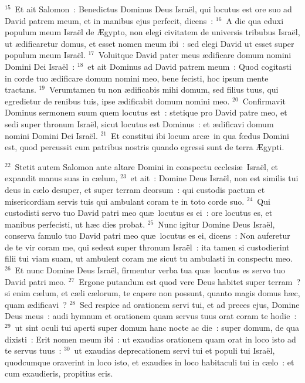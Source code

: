 ${}^{15}$~Et ait Salomon~: Benedictus Dominus Deus Isra\"el, qui locutus est ore suo ad David patrem meum, et in manibus ejus perfecit, dicens~:
${}^{16}$~A die qua eduxi populum meum Isra\"el de \AE gypto, non elegi civitatem de universis tribubus Isra\"el, ut \ae dificaretur domus, et esset nomen meum ibi~: sed elegi David ut esset super populum meum Isra\"el.
${}^{17}$~Voluitque David pater meus \ae dificare domum nomini Domini Dei Isra\"el~:
${}^{18}$~et ait Dominus ad David patrem meum~: Quod cogitasti in corde tuo \ae dificare domum nomini meo, bene fecisti, hoc ipsum mente tractans.
${}^{19}$~Verumtamen tu non \ae dificabis mihi domum, sed filius tuus, qui egredietur de renibus tuis, ipse \ae dificabit domum nomini meo.
${}^{20}$~Confirmavit Dominus sermonem suum quem locutus est~: stetique pro David patre meo, et sedi super thronum Isra\"el, sicut locutus est Dominus~: et \ae dificavi domum nomini Domini Dei Isra\"el.
${}^{21}$~Et constitui ibi locum arc\ae\ in qua fœdus Domini est, quod percussit cum patribus nostris quando egressi sunt de terra \AE gypti.


${}^{22}$~Stetit autem Salomon ante altare Domini in conspectu ecclesi\ae\ Isra\"el, et expandit manus suas in c\ae lum,
${}^{23}$~et ait~: Domine Deus Isra\"el, non est similis tui deus in c\ae lo desuper, et super terram deorsum~: qui custodis pactum et misericordiam servis tuis qui ambulant coram te in toto corde suo.
${}^{24}$~Qui custodisti servo tuo David patri meo qu\ae\ locutus es ei~: ore locutus es, et manibus perfecisti, ut h\ae c dies probat.
${}^{25}$~Nunc igitur Domine Deus Isra\"el, conserva famulo tuo David patri meo qu\ae\ locutus es ei, dicens~: Non auferetur de te vir coram me, qui sedeat super thronum Isra\"el~: ita tamen si custodierint filii tui viam suam, ut ambulent coram me sicut tu ambulasti in conspectu meo.
${}^{26}$~Et nunc Domine Deus Isra\"el, firmentur verba tua qu\ae\ locutus es servo tuo David patri meo.
${}^{27}$~Ergone putandum est quod vere Deus habitet super terram~? si enim c\ae lum, et c\ae li c\ae lorum, te capere non possunt, quanto magis domus h\ae c, quam \ae dificavi~?
${}^{28}$~Sed respice ad orationem servi tui, et ad preces ejus, Domine Deus meus~: audi hymnum et orationem quam servus tuus orat coram te hodie~:
${}^{29}$~ut sint oculi tui aperti super domum hanc nocte ac die~: super domum, de qua dixisti~: Erit nomen meum ibi~: ut exaudias orationem quam orat in loco isto ad te servus tuus~:
${}^{30}$~ut exaudias deprecationem servi tui et populi tui Isra\"el, quodcumque oraverint in loco isto, et exaudies in loco habitaculi tui in c\ae lo~: et cum exaudieris, propitius eris.



